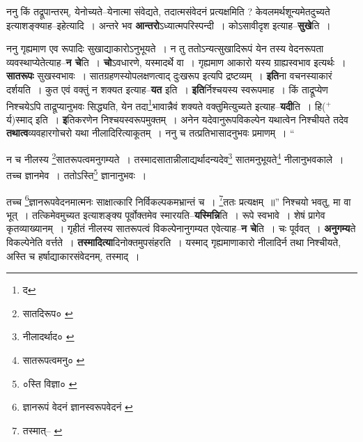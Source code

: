 \documentclass[article,12pt,a4paper]{memoir}
\newcommand{\add}[1]{($^{+}$#1)}
\begin{document}
	  \pstart ननु किं तद्रूपान्तरम्, येनोच्यते--येनात्मा संवेद्यते, तदात्मसंवेदनं प्रत्यक्षमिति ? केवलमर्थशून्यमेतदुच्यते इत्याशङ्क्याह--इहेत्यादि । अन्तरे भव \textbf{आन्तरो}ऽध्यात्मपरिस्पन्दी । कोऽसावीदृश इत्याह--\textbf{सुखे}ति ।
	\pend
      

	  \pstart ननु गृह्यमाण एव रूपादिः सुखाद्याकारोऽनुभूयते । न तु ततोऽन्यत्सुखादिरूपं येन तस्य वेदनरूपता व्यवस्थाप्येतेत्याह--\textbf{न चे}ति । \textbf{चो}ऽवधारणे, यस्मादर्थे वा । गृह्यमाण आकारो यस्य ग्राह्यस्वभाव इत्यर्थः । \textbf{सातरूपः} सुखस्वभावः । सातग्रहणस्योपलक्षणत्वाद् दुःखरूप इत्यपि द्रष्टव्यम् । \textbf{इति}ना वचनस्याकारं दर्शयति । कुत एवं वक्तुं न शक्यत इत्याह--\textbf{यत} इति । \textbf{इति}र्निश्चयस्य स्वरूपमाह । किं ताद्रूप्येण निश्चयेऽपि ताद्रूप्यानुभवः सिद्ध्यति, येन तदा\footnote{द}भावान्नैवं शक्यते वक्तुमित्युच्यते इत्याह--\textbf{यदी}ति । हि\add{र्य}स्माद् इति । \textbf{इ}तिकरणेन निश्चयस्वरूपमुक्तम् । अनेन यदेवानुरूपविकल्पेन यथात्वेन निश्चीयते तदेव \textbf{तथात्व}व्यवहारगोचरो यथा नीलादिरित्याकूतम् । ननु च तत्प्रतिभासादनुभवः प्रमाणम् ।  \leavevmode{} “
	  
	न च नीलस्य \footnote{सातदिरूप० \cite{dp-msC}}सातरूपत्वमनुगम्यते । तस्मादसातान्नीलाद्यर्थादन्यदेव\footnote{नीलादर्थाद० \cite{dp-msC} \cite{dp-msD}} सातमनुभूयते\footnote{सातरूपत्वमनु० \cite{dp-msD}} नीलानुभवकाले । तच्च ज्ञानमेव । ततोऽस्ति\footnote{०स्ति विज्ञा० \cite{dp-msD}} ज्ञानानुभवः । 
	  
	तच्च \footnote{ज्ञानरूपं वेदनं \cite{dp-msA} \cite{dp-msB} \cite{dp-edP} \cite{dp-edH} \cite{dp-edE} \cite{dp-edN} ज्ञानस्वरूपवेदनं \cite{dp-msC} \cite{dp-msD}}ज्ञानरूपवेदनमात्मनः साक्षात्कारि निर्विकल्पकमभ्रान्तं च । \footnote{तस्मात्--\cite{dp-msA} \cite{dp-msB} \cite{dp-msC} \cite{dp-edP} \cite{dp-edE} \cite{dp-edH} \cite{dp-edN}}ततः प्रत्यक्षम् ॥” निश्चयो भवतु, मा वा भूत् । तत्किमेवमुच्यत इत्याशङ्क्य पूर्वोक्तमेव स्मारयति--\textbf{यस्मिन्नि}ति । रूपे स्वभावे । शेषं प्रागेव कृतव्याख्यानम् । गृहीतं नीलस्य सातरूपत्वं विकल्पेनानुगम्यत एवेत्याह--\textbf{न चे}ति । चः पूर्ववत् । \textbf{अनुगम्य}ते विकल्पेनेति वर्त्तते । \textbf{तस्मादित्या}दिनोक्तमुपसंहरति । यस्माद् गृह्यमाणाकारो नीलादिर्न तथा निश्चीयते, अस्ति च हर्षाद्याकारसंवेदनम्, तस्माद् ।
	\pend
      
\end{document}
